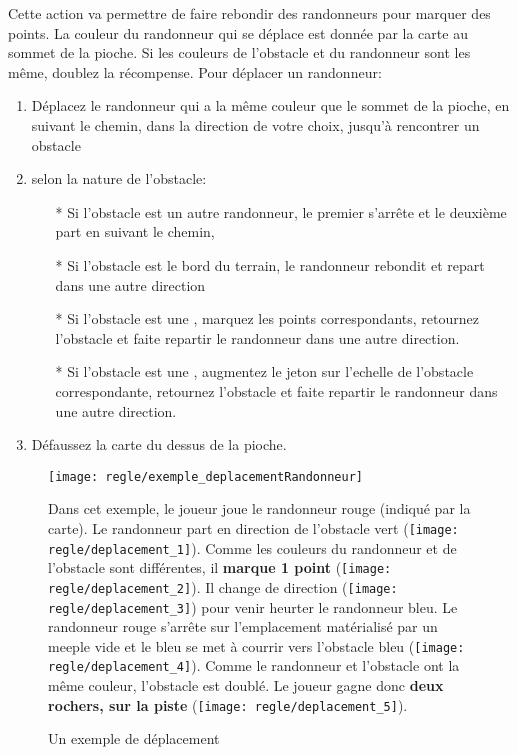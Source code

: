 Cette action va permettre de faire rebondir des randonneurs pour marquer des points. La couleur du randonneur qui se déplace est donnée par la carte au sommet de la pioche. Si les couleurs de l'obstacle et du randonneur sont les même, doublez la récompense. Pour déplacer un randonneur:
\begin{enumerate}
\item Déplacez le randonneur qui a la même couleur que le sommet de la pioche, en suivant le chemin, dans la direction de votre choix, jusqu'à rencontrer un obstacle
\item selon la nature de l'obstacle:
\begin{itemize}
\item[*] Si l'obstacle est un autre randonneur, le premier s'arrête et le deuxième part en suivant le chemin,
\item[*] Si l'obstacle est le bord du terrain, le randonneur rebondit et repart dans une autre direction
\item[*] Si l'obstacle est une \faceValeur, marquez les points correspondants, retournez l'obstacle et faite repartir le randonneur dans une autre direction.
\item[*] Si l'obstacle est une \faceObstacle, augmentez le jeton sur l'echelle de l'obstacle correspondante, retournez l'obstacle et faite repartir le randonneur dans une autre direction.
\end{itemize}
\item Défaussez la carte du dessus de la pioche.
\end{enumerate}

\begin{figure}[h]
\begin{tcolorbox}[colback=white,colframe=OliveGreen!75!black,title=Exemple]
{
	\texttt{[image: regle/exemple\_deplacementRandonneur]}
    \caption{Un exemple de déplacement}

Dans cet exemple, le joueur \foudre joue le randonneur rouge (indiqué par la carte). Le randonneur part en direction de l'obstacle vert (\texttt{[image: regle/deplacement\_1]}). Comme les couleurs du randonneur et de l'obstacle sont différentes, il \textbf{marque 1 point} (\texttt{[image: regle/deplacement\_2]}). Il change de direction (\texttt{[image: regle/deplacement\_3]}) pour venir heurter le randonneur bleu. Le randonneur rouge s'arrête sur l'emplacement matérialisé par un meeple vide et le bleu se met à courrir vers l'obstacle bleu (\texttt{[image: regle/deplacement\_4]}). Comme le randonneur et l'obstacle ont la même couleur, l'obstacle est doublé. Le joueur gagne donc \textbf{deux rochers, sur la piste \rocher} (\texttt{[image: regle/deplacement\_5]}).
}
\end{tcolorbox}
\end{figure}
\FloatBarrier


